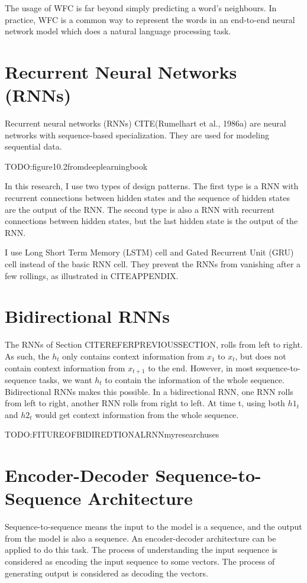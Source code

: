 \documentclass[modernstyle,12pt]{sjsuthesis}
\theoremstyle{definition}
\begin{document}
The usage of WFC is far beyond simply predicting a word's neighbours. In practice, WFC is a common way to represent the words in an end-to-end neural network model which does a natural language processing task.
\section{Recurrent Neural Networks (RNNs)}
Recurrent neural networks (RNNs) CITE(Rumelhart et al., 1986a) are neural networks with sequence-based specialization. They are used for modeling sequential data.

TODO:figure10.2fromdeeplearningbook

In this research, I use two types of design patterns. The first type is a RNN with recurrent connections between hidden states and the sequence of hidden states are the output of the RNN. The second type is also a RNN with recurrent connections between hidden states, but the last hidden state is the output of the RNN.

I use Long Short Term Memory (LSTM) cell and Gated Recurrent Unit (GRU) cell instead of the basic RNN cell. They prevent the RNNs from vanishing after a few rollings, as illustrated in CITEAPPENDIX.
\section{Bidirectional RNNs}

The RNNs of Section CITEREFERPREVIOUSSECTION, rolls from left to right. As such, the $h_t$ only contains context information from $x_1$ to $x_t$, but does not contain context information from $x_{t+1}$ to the end. However, in most sequence-to-sequence tasks, we want $h_t$ to contain the information of the whole sequence. Bidirectional RNNs makes this possible. In a bidirectional RNN, one RNN rolls from left to right, another RNN rolls from right to left. At time t, using both $h1_t$ and $h2_t$ would get context information from the whole sequence.

TODO:FITUREOFBIDIREDTIONALRNNmyresearchuses

\section{Encoder-Decoder Sequence-to-Sequence Architecture}

Sequence-to-sequence means the input to the model is a sequence, and the output from the model is also a sequence. An encoder-decoder architecture can be applied to do this task. The process of understanding the input sequence is considered as encoding the input sequence to some vectors. The process of generating output is considered as decoding the vectors.
\end{document}
